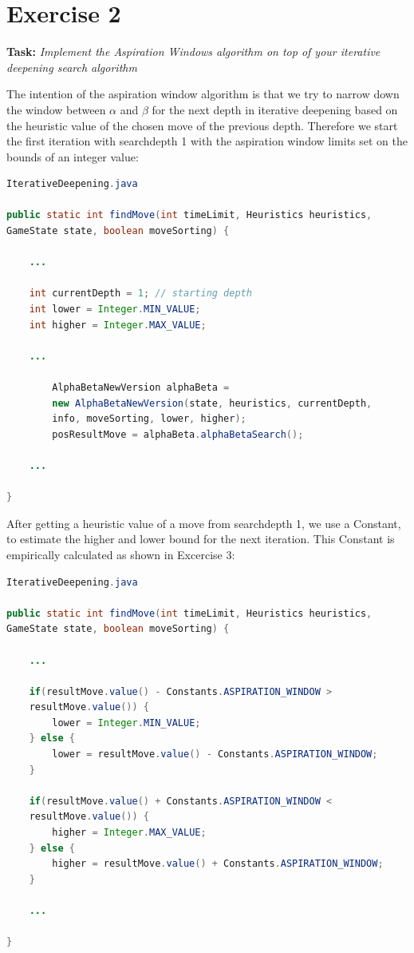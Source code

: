\section*{Exercise 2}

\textbf{Task:} \textit{Implement the Aspiration Windows algorithm on top of your iterative deepening search algorithm}

\noindent The intention of the aspiration window algorithm is that we try to narrow down the window between $\alpha$ and $\beta$ for the next depth in iterative deepening based on the heuristic value of the chosen move of the previous depth.
Therefore we start the first iteration with searchdepth 1 with the aspiration window limits set on the bounds of an integer value:
\begin{lstlisting}[language=Java, basicstyle=\ttfamily\small]
IterativeDeepening.java

public static int findMove(int timeLimit, Heuristics heuristics, 
GameState state, boolean moveSorting) {

    ...
        
    int currentDepth = 1; // starting depth
    int lower = Integer.MIN_VALUE;
    int higher = Integer.MAX_VALUE;

    ...

        AlphaBetaNewVersion alphaBeta = 
        new AlphaBetaNewVersion(state, heuristics, currentDepth, 
        info, moveSorting, lower, higher);
        posResultMove = alphaBeta.alphaBetaSearch();
        
    ...

}
\end{lstlisting}

\noindent After getting a heuristic value of a move from searchdepth 1, we use a Constant, to estimate the higher and lower bound for the next iteration. This Constant is empirically calculated as shown in Excercise 3: 

\begin{lstlisting}[language=Java, basicstyle=\ttfamily\small]
IterativeDeepening.java

public static int findMove(int timeLimit, Heuristics heuristics, 
GameState state, boolean moveSorting) {

    ...
        
    if(resultMove.value() - Constants.ASPIRATION_WINDOW > 
    resultMove.value()) {
        lower = Integer.MIN_VALUE;
    } else {
        lower = resultMove.value() - Constants.ASPIRATION_WINDOW;
    }
    
    if(resultMove.value() + Constants.ASPIRATION_WINDOW < 
    resultMove.value()) {
        higher = Integer.MAX_VALUE;
    } else {
        higher = resultMove.value() + Constants.ASPIRATION_WINDOW;
    }
        
    ...
        
}
\end{lstlisting}

